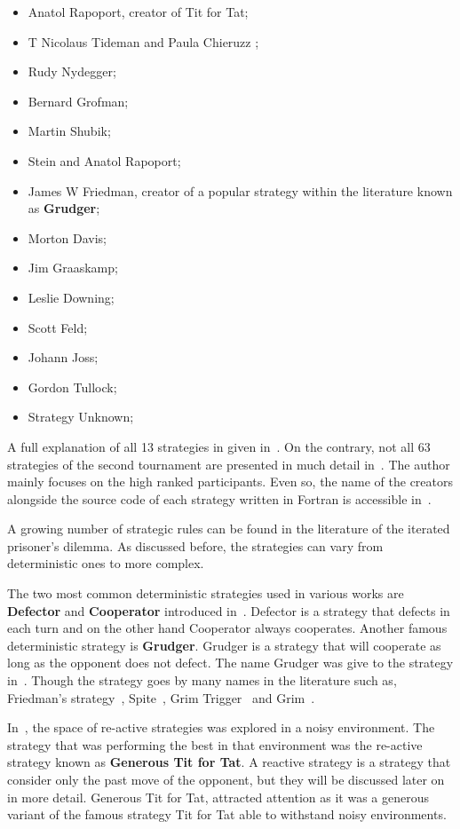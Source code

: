 \documentclass{article}
\begin{document}
\begin{itemize}
    \item Anatol Rapoport, creator of Tit for Tat;
    \item T Nicolaus Tideman and Paula Chieruzz	;
    \item Rudy Nydegger;
    \item Bernard Grofman;
    \item Martin Shubik;
    \item Stein and Anatol Rapoport;
    \item James W Friedman, creator of a popular strategy within the literature 
    known as \textbf{Grudger};
    \item Morton Davis;
    \item Jim Graaskamp; 
    \item Leslie Downing; 
    \item Scott Feld; 
    \item Johann Joss; 
    \item Gordon Tullock; 
    \item Strategy Unknown; 
\end{itemize}

A full explanation of all 13 strategies in given in~\cite{Axelrod1981}.
On the contrary, not all 63 strategies of the second tournament are presented 
in much detail in~\cite{Axelrod1981}. The author mainly focuses on the high ranked
participants. Even so, the name of the creators alongside the source code of each 
strategy written in Fortran is accessible in~\cite{fortan_code}.

A growing number of strategic rules can be found in the literature of the
iterated prisoner's dilemma. As discussed before, the strategies can vary from
deterministic ones to more complex.

The two most common deterministic strategies used in various works are
\textbf{Defector} and \textbf{Cooperator} introduced in~\cite{Axelrod1981}.
Defector is a strategy that defects in each turn and on the other hand Cooperator
always cooperates. Another famous deterministic strategy is \textbf{Grudger}.
Grudger is a strategy that will cooperate as long as the opponent does not 
defect. The name Grudger was give to the strategy in~\cite{Li2014}.
Though the strategy goes by many names in the literature such as, 
Friedman's strategy~\cite{Axelrod1981}, Spite~\cite{Beaufils1997}, 
Grim Trigger~\cite{Banks1990} and Grim~\cite{Van2015}.

In~\cite{Nowak1990}, the space of re-active strategies was explored in a noisy
environment. The strategy that was performing the best in that environment was
the re-active strategy known as \textbf{Generous Tit for Tat}. A reactive 
strategy is a strategy that consider only the past move of the opponent, but 
they will be discussed later on in more detail. Generous Tit for Tat, attracted
attention as it was a generous variant of the famous strategy Tit for Tat able
to withstand noisy environments.
\end{document}
